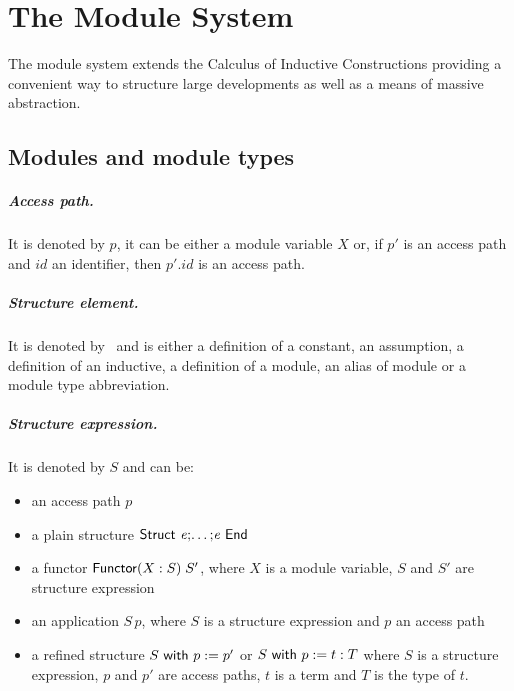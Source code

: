 \chapter[The Module System]{The Module System\label{chapter:Modules}}

The module system extends the Calculus of Inductive Constructions
providing a convenient way to structure large developments as well as
a means of massive abstraction.

\section{Modules and module types}

\paragraph{Access path.} It is denoted by $p$, it can be either a module 
variable $X$ or, if $p'$ is an access path and $id$ an identifier, then
$p'.id$ is an access path.

\paragraph{Structure element.} It is denoted by \elem\ and is either a
definition of a constant, an assumption, a definition of an inductive,
 a definition of a module, an alias of module or a module type abbreviation.

\paragraph{Structure expression.} It is denoted by $S$ and can be:
\begin{itemize}
\item an access path $p$
\item a plain structure ${\sf Struct}~{{\it e}} {\tt ;} \mbox{\dots} {\tt ;} {{\it e}}~{\sf End}$
\item a functor ${\sf Functor}(X:S)\;S'$, where $X$ is a module variable,
  $S$ and $S'$ are structure expression
\item an application $S\,p$, where $S$ is a structure expression and $p$ 
an access path 
\item a refined structure $S~{\sf with}~p := p'$ or $S~{\sf with}~p := t:T$ where $S$
is a structure expression, $p$ and $p'$ are access paths, $t$ is a term 
and $T$ is the type of $t$.
\end{itemize}

